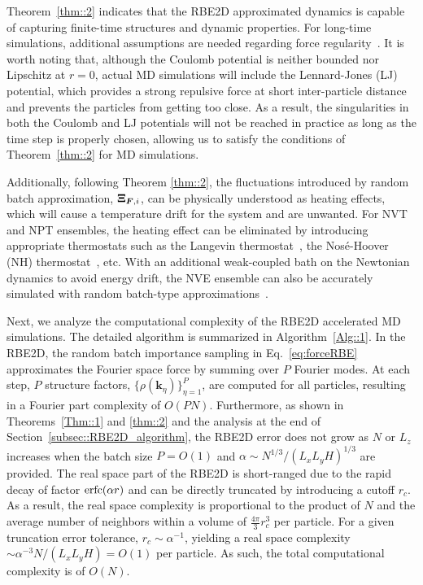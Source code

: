 Theorem~\ref{thm::2} indicates that the RBE2D approximated dynamics is capable of capturing finite-time structures and dynamic properties.
For long-time simulations, additional assumptions are needed regarding force regularity~\cite{Jin2022MMS}. 
It   {is worth} noting that, although the Coulomb potential is neither bounded nor Lipschitz at $r=0$, actual MD simulations will include the Lennard-Jones (LJ) potential, which provides a  {strong repulsive force at short inter-particle distance and prevents the particles from getting too close. As a result, the singularities in both the Coulomb and LJ potentials will not be reached in practice as long as the time step is properly chosen, allowing us to satisfy the conditions of Theorem~\ref{thm::2}  for MD simulations.}

Additionally, following Theorem \ref{thm::2}, the fluctuations introduced by random batch approximation, $\boldsymbol{\Xi}_{\boldsymbol{F},i}$,  can be physically understood as heating effects, which will cause a temperature drift for the system and are unwanted. 
For NVT and NPT ensembles, the heating effect can be eliminated by introducing appropriate thermostats such as the Langevin thermostat~\cite{feller1995constant}, the Nos\'e-Hoover (NH) thermostat~\cite{hoover1985canonical}, etc. With an additional weak-coupled bath on the Newtonian dynamics to avoid energy drift, the NVE ensemble can also be accurately simulated with random batch-type approximations~\cite{liang2024JCP}.

Next, we analyze the computational complexity of the RBE2D accelerated MD simulations. The detailed algorithm is summarized in Algorithm~\ref{Alg::1}.  
In the RBE2D, the random batch importance sampling in Eq.~\eqref{eq:forceRBE} approximates the Fourier space force by summing over $P$ Fourier modes. 
At each step, $P$ structure factors, $\{\rho(\bm{k}_{\eta})\}_{\eta=1}^{P}$, are computed for all particles, resulting in a Fourier part complexity of $O(PN)$. Furthermore, as shown in Theorems~\ref{Thm::1} and \ref{thm::2} and the analysis at the end of Section~\ref{subsec::RBE2D_algorithm}, the RBE2D error does not grow as $N$ or $L_z$ increases when the batch size $P=O(1)$ and $\alpha\sim N^{1/3}/(L_xL_yH)^{1/3}$ are provided. 
The real space part of the RBE2D is short-ranged due to the rapid decay of factor $\operatorname{erfc}(\alpha r)$ and can be directly truncated by introducing a cutoff $r_c$. 
As a result, the real space complexity is proportional to the product of $N$ and the average number of neighbors within a volume of $\frac{4\pi}{3} r_c^3$ per particle. 
For a given truncation error tolerance, $r_c\sim \alpha^{-1}$, yielding a real space complexity $\sim \alpha^{-3}N/(L_xL_yH)=O(1)$ per particle. 
As such, the total computational complexity is of $O(N)$. 

